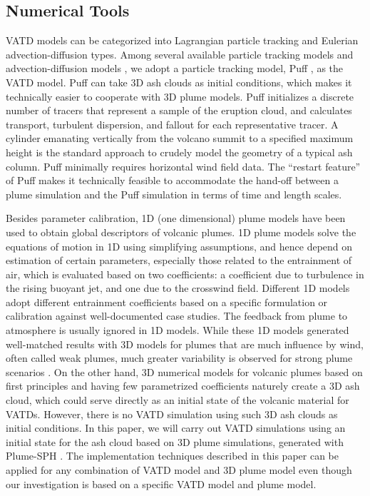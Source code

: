 \documentclass[draft,linenumbers]{agujournal2019}
\begin{document}
\subsection{Numerical Tools}
VATD models can be categorized into Lagrangian particle tracking and Eulerian advection-diffusion types.  Among several available particle tracking models \citep[e.g.][]{walko1995hypact, searcy1998puff, d1998modeling, draxler1998overview} and advection-diffusion models \citep[e.g.][]{bonadonna2005total, folch2009fall3d, schwaiger2012ash3d}, we adopt a particle tracking model, Puff \citep{tanaka1991development,searcy1998puff}, as the VATD model. Puff can take 3D ash clouds as initial conditions, which makes it technically easier to cooperate with 3D plume models. Puff initializes a discrete number of tracers that represent a sample of the eruption cloud, and calculates transport, turbulent dispersion, and fallout for each representative tracer.  A cylinder emanating vertically from the volcano summit to a specified maximum height is the standard approach to crudely model the geometry of a typical ash column. Puff minimally requires horizontal wind field data. The ``restart feature'' of Puff makes it technically feasible to accommodate the hand-off between a plume simulation and the Puff simulation in terms of time and length scales.

Besides parameter calibration, 1D (one dimensional) plume models have been used to obtain global descriptors of volcanic plumes.  1D plume models \citep [e.g.][]{woods1988fluid, bursik2001effect, mastin2007user, de2015plume, folch2016fplume, pouget2016sensitivity} solve the equations of motion in 1D using simplifying assumptions, and hence depend on estimation of certain parameters, especially those related to the entrainment of air, which is evaluated based on two coefficients: a coefficient due to turbulence in the rising buoyant jet, and one due to the crosswind field. Different 1D models adopt different entrainment coefficients based on a specific formulation or calibration against well-documented case studies. The feedback from plume to atmosphere is usually ignored in 1D models. While these 1D models generated well-matched results with 3D models for plumes that are much influence by wind, often called weak plumes, much greater variability is observed for strong plume scenarios \citep{costa2016results}. On the other hand, 3D numerical models for volcanic plumes based on first principles and having few parametrized coefficients \citep{oberhuber1998volcanic, neri2003multiparticle, suzuki2005numerical, cerminara2016ashee, cao2018plume} naturely create a 3D ash cloud, which could serve directly as an initial state of the volcanic material for VATDs. However, there is no VATD simulation using such 3D ash clouds as initial conditions. In this paper, we will carry out VATD simulations using an initial state for the ash cloud based on 3D plume simulations, generated with Plume-SPH \citep{cao2018plume}.  The implementation techniques described in this paper can be applied for any combination of VATD model and 3D plume model even though our investigation is based on a specific VATD model and plume model.
\end{document}
